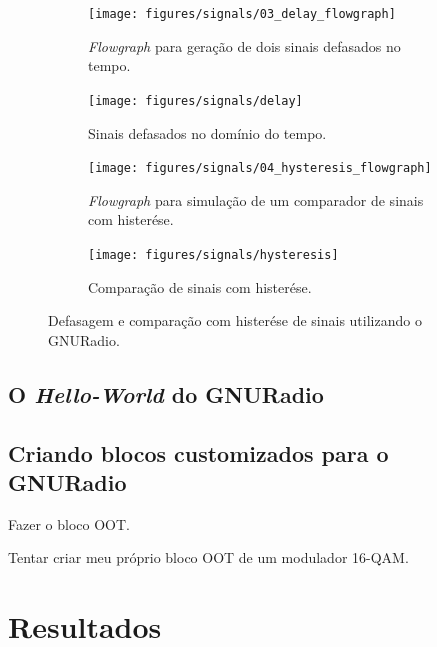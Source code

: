 \documentclass[
  12pt,				%
  openright,			%
  twoside,			%
  a4paper,			%
  english,			%
  french,				%
  spanish,			%
  brazil,				%
  ]{abntex2}
\begin{document}
\begin{figure}[!htb]
  \centering
  \begin{subfigure}[b]{0.52\linewidth}
    \centering
    \caption{\textit{Flowgraph} para geração de dois sinais defasados no tempo.}
    \texttt{[image: figures/signals/03\_delay\_flowgraph]}
    \label{fig:gnuradio_delay_flowgraph}
  \end{subfigure}
  \hspace{0.5cm}
  \begin{subfigure}[b]{0.52\linewidth}
    \centering
    \caption{Sinais defasados no domínio do tempo.}
    \texttt{[image: figures/signals/delay]}
    \label{fig:gnuradio_delay}
  \end{subfigure}
  \quad
  \begin{subfigure}[b]{0.52\linewidth}
    \centering
    \caption{\textit{Flowgraph} para simulação de um comparador de sinais com histerése.}
    \texttt{[image: figures/signals/04\_hysteresis\_flowgraph]}
    \label{fig:gnuradio_hysteresis_flowgraph}
  \end{subfigure}
  \hspace{0.5cm}
  \begin{subfigure}[b]{0.52\linewidth}
    \centering
    \caption{Comparação de sinais com histerése.}
    \texttt{[image: figures/signals/hysteresis]}
    \label{fig:gnuradio_hysteresis}
  \end{subfigure}
  \caption{Defasagem e comparação com histerése de sinais utilizando o GNURadio.}
  \label{fig:gnuradio_signals_operations}
\end{figure}

\chapter{O \textit{Hello-World} do GNURadio}

\chapter{Criando blocos customizados para o GNURadio}

Fazer o bloco OOT.

Tentar criar meu próprio bloco OOT de um modulador 16-QAM.

\part{Resultados}
\end{document}
